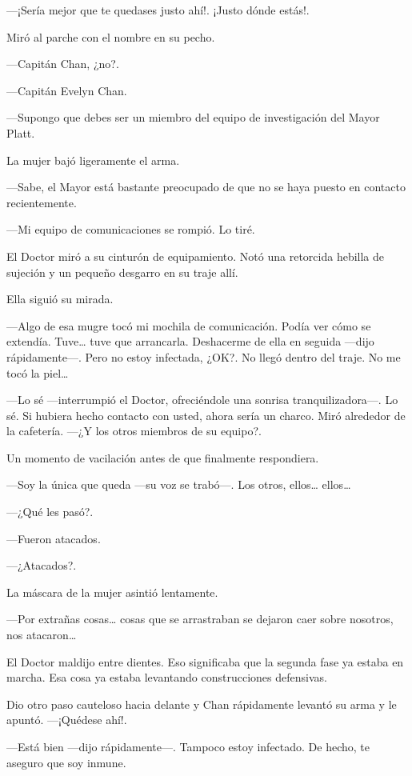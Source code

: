---¡Sería mejor que te quedases justo ahí!. ¡Justo dónde estás!.

Miró al parche con el nombre en su pecho.

---Capitán Chan, ¿no?.

---Capitán Evelyn Chan.

---Supongo que debes ser un miembro del equipo de investigación del
Mayor Platt.

La mujer bajó ligeramente el arma.

---Sabe, el Mayor está bastante preocupado de que no se haya puesto en
contacto recientemente.

---Mi equipo de comunicaciones se rompió. Lo tiré.

El Doctor miró a su cinturón de equipamiento. Notó una retorcida hebilla
de sujeción y un pequeño desgarro en su traje allí.

Ella siguió su mirada.

---Algo de esa mugre tocó mi mochila de comunicación. Podía ver cómo se
extendía. Tuve\ldots{} tuve que arrancarla. Deshacerme de ella en
seguida ---dijo rápidamente---. Pero no estoy infectada, ¿OK?. No llegó
dentro del traje. No me tocó la piel\ldots{}

---Lo sé ---interrumpió el Doctor, ofreciéndole una sonrisa
tranquilizadora---. Lo sé. Si hubiera hecho contacto con usted, ahora
sería un charco. Miró alrededor de la cafetería. ---¿Y los otros
miembros de su equipo?.

Un momento de vacilación antes de que finalmente respondiera.

---Soy la única que queda ---su voz se trabó---. Los otros,
ellos\ldots{} ellos\ldots{}

---¿Qué les pasó?.

---Fueron atacados.

---¿Atacados?.

La máscara de la mujer asintió lentamente.

---Por extrañas cosas\ldots{} cosas que se arrastraban se dejaron caer
sobre nosotros, nos atacaron\ldots{}

El Doctor maldijo entre dientes. Eso significaba que la segunda fase ya
estaba en marcha. Esa cosa ya estaba levantando construcciones
defensivas.

Dio otro paso cauteloso hacia delante y Chan rápidamente levantó su arma
y le apuntó. ---¡Quédese ahí!.

---Está bien ---dijo rápidamente---. Tampoco estoy infectado. De hecho,
te aseguro que soy inmune.

